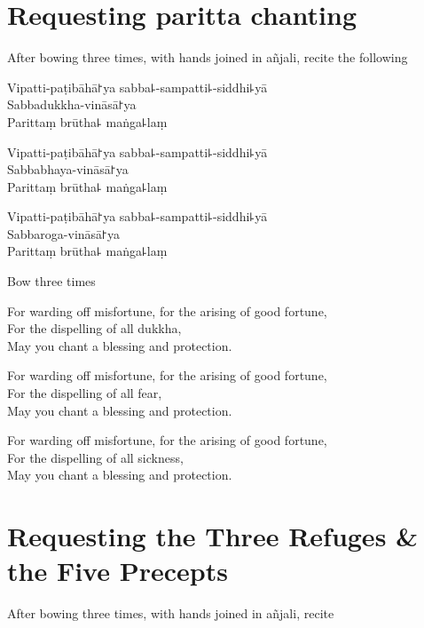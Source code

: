 \clearpage
\chapter{Requesting paritta chanting}

\begin{instruction}
  After bowing three times, with hands joined in añjali, recite the following
\end{instruction}

Vipatti-paṭibāhā꜓ya sabba꜕-sampatti꜕-siddhi꜕yā\\
Sabbadukkha-vināsā꜓ya\\
Parittaṃ brūtha꜕ maṅga꜕laṃ

Vipatti-paṭibāhā꜓ya sabba꜕-sampatti꜕-siddhi꜕yā\\
Sabbabhaya-vināsā꜓ya\\
Parittaṃ brūtha꜕ maṅga꜕laṃ

Vipatti-paṭibāhā꜓ya sabba꜕-sampatti꜕-siddhi꜕yā\\
Sabbaroga-vināsā꜓ya\\
Parittaṃ brūtha꜕ maṅga꜕laṃ

\begin{instruction}
  Bow three times
\end{instruction}

\begin{english}
For warding off misfortune, for the arising of good fortune,\\
For the dispelling of all dukkha,\\
May you chant a blessing and protection.

For warding off misfortune, for the arising of good fortune,\\
For the dispelling of all fear,\\
May you chant a blessing and protection.

For warding off misfortune, for the arising of good fortune,\\
For the dispelling of all sickness,\\
May you chant a blessing and protection.
\end{english}

\setlength{\englishIndent}{\leaderIndent}

\clearpage
\chapter{Requesting the Three Refuges \& the Five Precepts}

\begin{instruction}
  After bowing three times, with hands joined in añjali, recite
\end{instruction}

